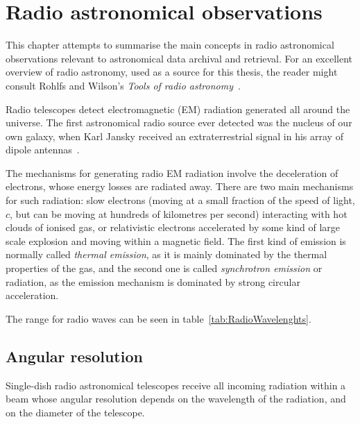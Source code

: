 \chapter{Radio astronomical observations}
\label{introradiospecifics}

This chapter attempts to summarise the main concepts in radio
astronomical observations relevant to astronomical data archival and
retrieval. For an excellent overview of radio astronomy, used as a source
for this thesis, the reader might consult Rohlfs and Wilson's
\emph{Tools of radio astronomy}~\cite{2004tra..book.....R}.

Radio telescopes detect electromagnetic (EM) radiation generated all
around the universe. The first astronomical radio source ever detected
was the nucleus of our own galaxy, when Karl Jansky received an
extraterrestrial signal in his array of dipole
antennas~\cite{Jansky:1933db, Jansky:1935lq}.

The mechanisms for generating radio EM radiation involve the deceleration
of electrons, whose energy losses are radiated away. There are two main
mechanisms for such radiation: slow electrons (moving at a small fraction
of the speed of light, $c$, but can be moving at hundreds of kilometres
per second) interacting with hot clouds of ionised gas, or relativistic
electrons accelerated by some kind of large scale explosion and moving
within a magnetic field. The first kind of emission is normally called
\emph{thermal emission}, as it is mainly dominated by the thermal
properties of the gas, and the second one is called \emph{synchrotron
emission} or radiation, as the emission mechanism is dominated by strong
circular acceleration.

The range for radio waves can be seen in
table~\ref{tab:RadioWavelenghts}.


\section{Angular resolution} %
\label{sec:angular_resolution}

Single-dish radio astronomical telescopes receive all incoming radiation
within a beam whose angular resolution depends on the wavelength of the
radiation, and on the diameter of the telescope.




